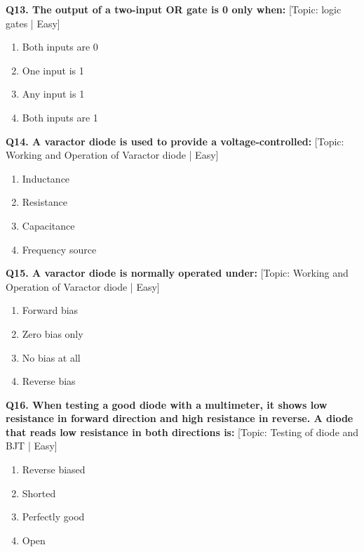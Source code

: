 \noindent\textbf{Q13. The output of a two-input OR gate is 0 only when:} \hfill [Topic: logic gates | Easy]
\begin{enumerate}[label=(\alph*),topsep=2pt,itemsep=1pt,partopsep=0pt,parsep=0pt]
    \item {Both inputs are 0}
    \item {One input is 1}
    \item {Any input is 1}
    \item {Both inputs are 1}
\end{enumerate}
\vspace{2mm}

\noindent\textbf{Q14. A varactor diode is used to provide a voltage-controlled:} \hfill [Topic: Working and Operation of Varactor diode | Easy]
\begin{enumerate}[label=(\alph*),topsep=2pt,itemsep=1pt,partopsep=0pt,parsep=0pt]
    \item {Inductance}
    \item {Resistance}
    \item {Capacitance}
    \item {Frequency source}
\end{enumerate}
\vspace{2mm}

\noindent\textbf{Q15. A varactor diode is normally operated under:} \hfill [Topic: Working and Operation of Varactor diode | Easy]
\begin{enumerate}[label=(\alph*),topsep=2pt,itemsep=1pt,partopsep=0pt,parsep=0pt]
    \item {Forward bias}
    \item {Zero bias only}
    \item {No bias at all}
    \item {Reverse bias}
\end{enumerate}
\vspace{2mm}

\noindent\textbf{Q16. When testing a good diode with a multimeter, it shows low resistance in forward direction and high resistance in reverse. A diode that reads low resistance in both directions is:} \hfill [Topic: Testing of diode and BJT | Easy]
\begin{enumerate}[label=(\alph*),topsep=2pt,itemsep=1pt,partopsep=0pt,parsep=0pt]
    \item {Reverse biased}
    \item {Shorted}
    \item {Perfectly good}
    \item {Open}
\end{enumerate}
\vspace{2mm}

